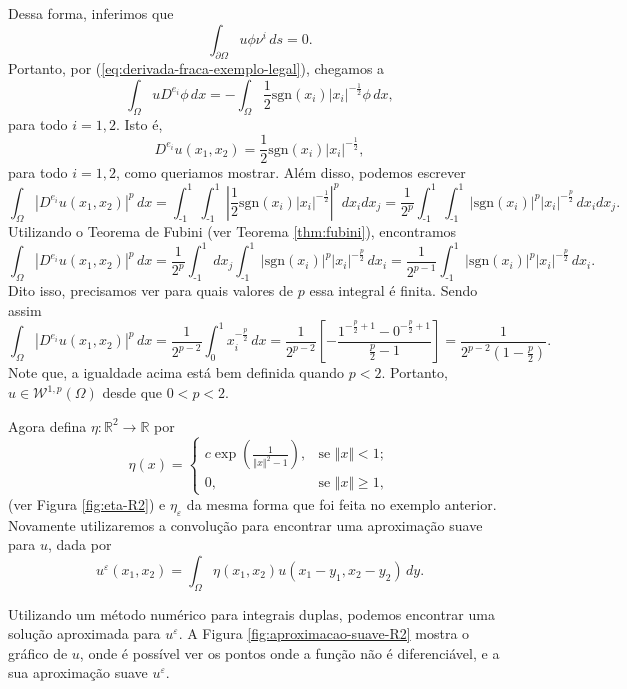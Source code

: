 \documentclass[a4paper, 11pt]{book}
\theoremstyle{definition}
\newcommand{\bR}{\mathbb{R}}
\newcommand{\cW}{\mathcal{W}}
\newcommand{\sgn}{\mathrm{sgn}}
\begin{document}
\begin{ex}
    Dessa forma, inferimos que
    \[
        \int_{\partial\Omega} u \phi \nu^i \,ds = 0.
    \]
    Portanto, por (\ref{eq:derivada-fraca-exemplo-legal}), chegamos a
    \[
        \int_\Omega  u D^{e_i} \phi \,dx = - \int_\Omega \frac{1}{2}\sgn(x_i) |x_i|^{-\frac{1}{2}} \phi \,dx,
    \]
    para todo $i=1,2$.
    Isto é,
    \[
        D^{e_i} u(x_1,x_2) = \frac{1}{2}\sgn(x_i) |x_i|^{-\frac{1}{2}},
    \]
    para todo $i = 1,2$, como queriamos mostrar.
    Além disso, podemos escrever
    \[
        \int_\Omega |D^{e_i} u (x_1,x_2)|^p \, dx = \int_{\text{-}1}^1 \int_{\text{-}1}^1 \left| \frac{1}{2} \sgn(x_i) |x_i|^{-\frac{1}{2}} \right|^p \, dx_i dx_j = \frac{1}{2^p}\int_{\text{-}1}^1 \int_{\text{-}1}^1 |\sgn(x_i)|^p |x_i|^{-\frac{p}{2}} \,dx_i dx_j.
    \]
    Utilizando o Teorema de Fubini (ver Teorema \ref{thm:fubini}), encontramos
    {\small
    \[
        \int_\Omega |D^{e_i} u (x_1,x_2)|^p \, dx = \frac{1}{2^p}\int_{\text{-}1}^1 dx_j \int_{\text{-}1}^1 |\sgn(x_i)|^p |x_i|^{-\frac{p}{2}} \,dx_i = \frac{1}{2^{p-1}} \int_{\text{-}1}^1 |\sgn(x_i)|^p |x_i|^{-\frac{p}{2}} \,dx_i.
    \]}\!
    Dito isso, precisamos ver para quais valores de $p$ essa integral é finita. Sendo assim
    \[
        \int_\Omega |D^{e_i} u (x_1,x_2)|^p \, dx = \frac{1}{2^{p-2}}\int_0^1 x_i^{-\frac{p}{2}} \,dx = \frac{1}{2^{p-2}} \left[ -\frac{1^{-\frac{p}{2}+1} - 0^{-\frac{p}{2}+1}}{\tfrac{p}{2} - 1} \right] = \frac{1}{2^{p-2}\left( 1 - \frac{p}{2} \right)}.
    \]
    Note que, a igualdade acima está bem definida quando $p < 2$. Portanto, $u \in \cW^{1,p}(\Omega)$ desde que $0 < p < 2$.

    Agora defina $\eta: \bR^2 \to \bR$ por
    \[
        \eta(x) = 
        \left\{ 
            \begin{array}{lr}
                c \exp\left(\frac{1}{\Vert x \Vert^2 - 1} \right), & \text{se } \Vert x \Vert < 1;\\
                0, & \text{se } \Vert x \Vert \geqslant 1,
            \end{array}
        \right.
    \]
    (ver Figura \ref{fig:eta-R2}) e $\eta_\varepsilon$ da mesma forma que foi feita no exemplo anterior. Novamente utilizaremos a convolução para encontrar uma aproximação suave para $u$, dada por
    \[
        u^{\varepsilon}(x_1,x_2) = \int_\Omega \eta(x_1,x_2) u(x_1 - y_1, x_2 - y_2) \,dy.
    \]

    Utilizando um método numérico para integrais duplas, podemos encontrar uma solução aproximada para $u^\varepsilon$.
    A Figura \ref{fig:aproximacao-suave-R2} mostra o gráfico de $u$, onde é possível ver os pontos onde a função não é diferenciável, e a sua aproximação suave $u^\varepsilon$.


\end{ex}
\end{document}
